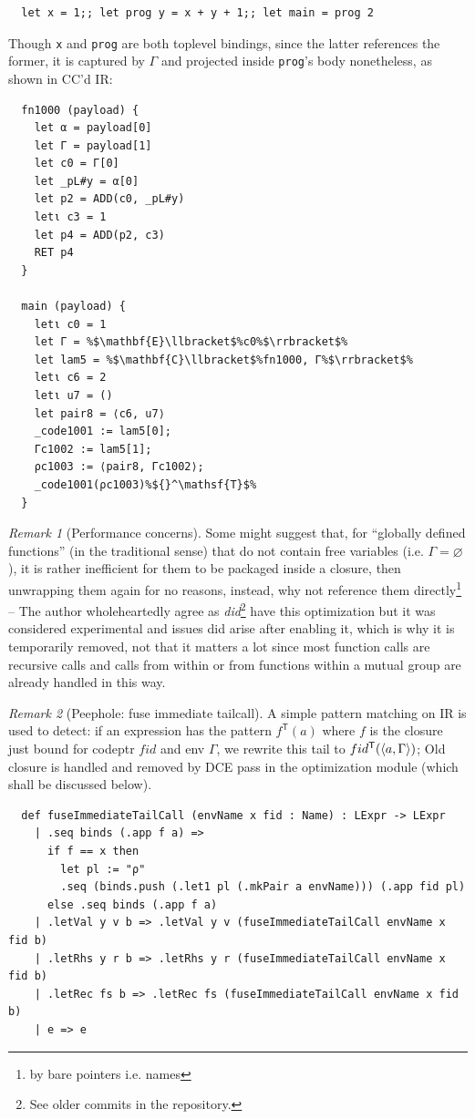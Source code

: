\documentclass[a4paper, 11pt]{article}
\theoremstyle{remark}\newtheorem*{remark}{Remark}
\theoremstyle{definition}\newtheorem*{definition}{Definition}
\begin{document}
\begin{verbatim}
  let x = 1;; let prog y = x + y + 1;; let main = prog 2
\end{verbatim}

Though \texttt{x} and \texttt{prog} are both toplevel bindings, since the latter references the former, it is captured by $\Gamma$ and projected inside \texttt{prog}'s body nonetheless, as shown in CC'd IR:

\begin{verbatim}
  fn1000 (payload) {
    let α = payload[0]
    let Γ = payload[1]
    let c0 = Γ[0]
    let _pL#y = α[0]
    let p2 = ADD(c0, _pL#y)
    letι c3 = 1
    let p4 = ADD(p2, c3)
    RET p4
  }

  main (payload) {
    letι c0 = 1
    let Γ = %$\mathbf{E}\llbracket$%c0%$\rrbracket$%
    let lam5 = %$\mathbf{C}\llbracket$%fn1000, Γ%$\rrbracket$%
    letι c6 = 2
    letι u7 = ()
    let pair8 = ⟨c6, u7⟩
    _code1001 := lam5[0];
    Γc1002 := lam5[1];
    ρc1003 := ⟨pair8, Γc1002⟩;
    _code1001(ρc1003)%${}^\mathsf{T}$%
  }
\end{verbatim}

\begin{remark}[Performance concerns]
Some might suggest that, for ``globally defined functions''
(in the traditional sense) that do not contain free variables (i.e. $\Gamma=\varnothing$),
it is rather inefficient for them to be packaged inside a closure,
then unwrapping them again for no reasons, instead, why not reference them directly\footnote{
  by bare pointers i.e. names
} -- The author wholeheartedly agree as \Tigris
\textit{did}\footnote{See older commits in the repository.}
have this optimization but it was considered experimental and issues did arise after enabling it, which
is why it is temporarily removed,
not that it matters a lot since most function calls are recursive calls and
calls from within or from functions within a mutual group are already handled in this way.
\end{remark}

\begin{remark}[Peephole: fuse immediate tailcall]
A simple pattern matching on IR is used to detect: if an expression has the pattern $f^\mathsf{T}(a)$ where $f$ is the closure just bound for codeptr $fid$ and env $\Gamma$, we rewrite this tail to
$fid^\mathsf{T}(\langle a, \Gamma \rangle)$; Old closure is handled and removed by DCE pass in the
optimization module (which shall be discussed below).
\begin{verbatim}
  def fuseImmediateTailCall (envName x fid : Name) : LExpr -> LExpr
    | .seq binds (.app f a) =>
      if f == x then
        let pl := "ρ"
        .seq (binds.push (.let1 pl (.mkPair a envName))) (.app fid pl)
      else .seq binds (.app f a)
    | .letVal y v b => .letVal y v (fuseImmediateTailCall envName x fid b)
    | .letRhs y r b => .letRhs y r (fuseImmediateTailCall envName x fid b)
    | .letRec fs b => .letRec fs (fuseImmediateTailCall envName x fid b)
    | e => e
\end{verbatim}
\end{remark}
\end{document}
